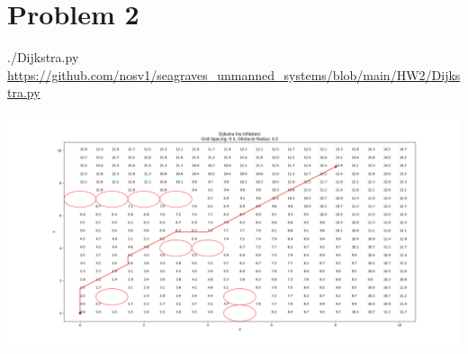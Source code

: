\documentclass{article}
\begin{document}
        \section*{Problem 2}
        \begin{minipage}{\linewidth}
            \raggedright
            ./Dijkstra.py \break
            \url{https://github.com/nosv1/seagraves_unmanned_systems/blob/main/HW2/Dijkstra.py}
            \begin{center}
                \includegraphics[width=\linewidth]{HW2P2 Dijkstra no inflation.png}
            \end{center}
        \end{minipage}
\end{document}
